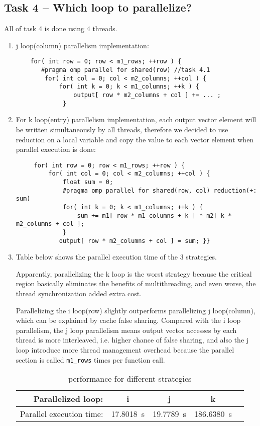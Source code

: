 \documentclass[a4paper, DIV12, headsepline]{scrartcl}
\begin{document}
\subsection*{Task 4 -- Which loop to parallelize?}
All of task 4 is done using 4 threads.
\begin{enumerate}
\item  j loop(column) parallelism implementation:
\begin{verbatim}
    for( int row = 0; row < m1_rows; ++row ) {
       #pragma omp parallel for shared(row) //task 4.1
        for( int col = 0; col < m2_columns; ++col ) {
            for( int k = 0; k < m1_columns; ++k ) {
                output[ row * m2_columns + col ] += ... ;
             }
\end{verbatim}

\item For k loop(entry) parallelism implementation,  each output vector element will be written simultaneously by all threads, therefore we decided to use reduction on a local variable and copy the value to each vector element  when parallel execution is done:
\begin{verbatim}
     for( int row = 0; row < m1_rows; ++row ) {
         for( int col = 0; col < m2_columns; ++col ) {
             float sum = 0;
             #pragma omp parallel for shared(row, col) reduction(+: sum)
             for( int k = 0; k < m1_columns; ++k ) {
                 sum += m1[ row * m1_columns + k ] * m2[ k * m2_columns + col ];
             }
            output[ row * m2_columns + col ] = sum; }}
\end{verbatim}
\item Table below shows the parallel execution time of the 3 strategies.

Apparently, parallelizing  the k loop is the worst strategy because the critical region basically eliminates the benefits of multithreading, and even worse, the thread synchronization added extra cost.

Parallelizing the i loop(row) slightly outperforms parallelizing j loop(column), which can be explained by cache false sharing. Compared with the i loop parallelism, the j loop parallelism means output vector accesses by each thread is more interleaved, i.e. higher chance of false sharing, and also the  j loop  introduce more thread management overhead because the parallel section is called \verb|m1_rows| times per function call.
\begin{table}[htbp]
\centering
{}
\begin{tabular}{rSSSS}
\hline
Parallelized loop: & {i} & {j} & {k} \\
\hline
Parallel execution time: & \SI{17.8018}{s} & \SI{19.7789}{s} & \SI{186.6380}{s}  \\
\hline
\end{tabular}
\caption{performance for different strategies}
\label{tab:tab43}
\end{table}
\end{enumerate}
\end{document}
